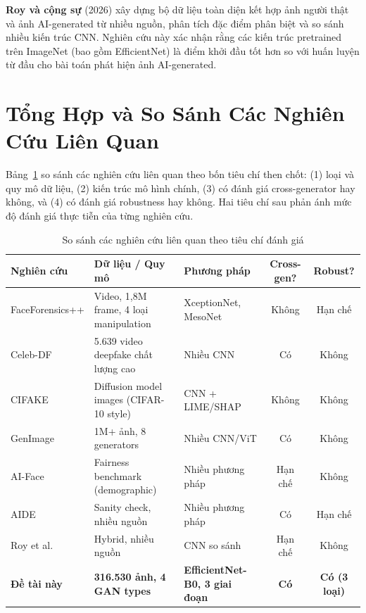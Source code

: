 \textbf{Roy và cộng sự} \cite{roy2026comprehensive} (2026) xây dựng bộ dữ liệu toàn diện kết hợp ảnh người thật và ảnh AI-generated từ nhiều nguồn, phân tích đặc điểm phân biệt và so sánh nhiều kiến trúc CNN. Nghiên cứu này xác nhận rằng các kiến trúc pretrained trên ImageNet (bao gồm EfficientNet) là điểm khởi đầu tốt hơn so với huấn luyện từ đầu cho bài toán phát hiện ảnh AI-generated.

\section{Tổng Hợp và So Sánh Các Nghiên Cứu Liên Quan}

Bảng~\ref{tab:related_work_compare} so sánh các nghiên cứu liên quan theo bốn tiêu chí then chốt: (1) loại và quy mô dữ liệu, (2) kiến trúc mô hình chính, (3) có đánh giá cross-generator hay không, và (4) có đánh giá robustness hay không. Hai tiêu chí sau phản ánh mức độ đánh giá thực tiễn của từng nghiên cứu.

\begin{table}[H]
  \centering
  \caption{So sánh các nghiên cứu liên quan theo tiêu chí đánh giá}
  \label{tab:related_work_compare}
  \begin{tabularx}{\linewidth}{lXlcc}
    \toprule
    \textbf{Nghiên cứu} & \textbf{Dữ liệu / Quy mô} & \textbf{Phương pháp} & \textbf{Cross-gen?} & \textbf{Robust?} \\
    \midrule
    FaceForensics++ \cite{rossler2019faceforensics} & Video, 1,8M frame, 4 loại manipulation & XceptionNet, MesoNet & Không & Hạn chế \\
    Celeb-DF \cite{li2020celebdf} & 5.639 video deepfake chất lượng cao & Nhiều CNN & Có & Không \\
    CIFAKE \cite{bird2024cifake} & Diffusion model images (CIFAR-10 style) & CNN + LIME/SHAP & Không & Không \\
    GenImage \cite{zhu2023genimage} & 1M+ ảnh, 8 generators & Nhiều CNN/ViT & Có & Không \\
    AI-Face \cite{lin2025aiface} & Fairness benchmark (demographic) & Nhiều phương pháp & Hạn chế & Không \\
    AIDE \cite{yan2025aide} & Sanity check, nhiều nguồn & Nhiều phương pháp & Có & Hạn chế \\
    Roy et al.\ \cite{roy2026comprehensive} & Hybrid, nhiều nguồn & CNN so sánh & Hạn chế & Không \\
    \midrule
    \textbf{Đề tài này} & \textbf{316.530 ảnh, 4 GAN types} & \textbf{EfficientNet-B0, 3 giai đoạn} & \textbf{Có} & \textbf{Có (3 loại)} \\
    \bottomrule
  \end{tabularx}
\end{table}

